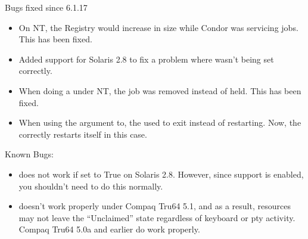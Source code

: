 \noindent Bugs fixed since 6.1.17
\begin{itemize}

\item On NT, the Registry would increase in size while Condor was
servicing jobs. This has been fixed.

\item Added  support for Solaris 2.8 to fix a problem where
 wasn't being set correctly.

\item When doing a  under NT, the job was removed instead of
held. This has been fixed.

\item When using the  argument to, the
 used to exit instead of restarting.
Now, the  correctly restarts itself in this case.

\end{itemize}

\noindent Known Bugs:
\begin{itemize}

\item {} does not work if set to True on Solaris 
2.8.  However, since  support is enabled, you shouldn't
need to do this normally.

\item {} doesn't work properly under Compaq Tru64 5.1, and
as a result, resources may not leave the ``Unclaimed'' state
regardless of keyboard or pty activity.  Compaq Tru64 5.0a and earlier
do work properly.

\end{itemize}
